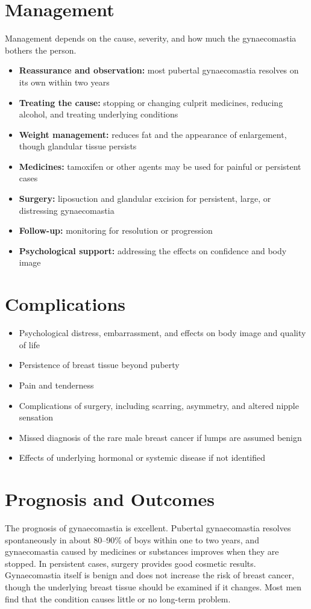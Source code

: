 \section*{Management}
Management depends on the cause, severity, and how much the gynaecomastia bothers the person.

\begin{itemize}
    \item \textbf{Reassurance and observation:} most pubertal gynaecomastia resolves on its own within two years
    \item \textbf{Treating the cause:} stopping or changing culprit medicines, reducing alcohol, and treating underlying conditions
    \item \textbf{Weight management:} reduces fat and the appearance of enlargement, though glandular tissue persists
    \item \textbf{Medicines:} tamoxifen or other agents may be used for painful or persistent cases
    \item \textbf{Surgery:} liposuction and glandular excision for persistent, large, or distressing gynaecomastia
    \item \textbf{Follow-up:} monitoring for resolution or progression
    \item \textbf{Psychological support:} addressing the effects on confidence and body image
\end{itemize}

\section*{Complications}
\begin{itemize}
    \item Psychological distress, embarrassment, and effects on body image and quality of life
    \item Persistence of breast tissue beyond puberty
    \item Pain and tenderness
    \item Complications of surgery, including scarring, asymmetry, and altered nipple sensation
    \item Missed diagnosis of the rare male breast cancer if lumps are assumed benign
    \item Effects of underlying hormonal or systemic disease if not identified
\end{itemize}

\section*{Prognosis and Outcomes}
The prognosis of gynaecomastia is excellent. Pubertal gynaecomastia resolves spontaneously in about 80--90\% of boys within one to two years, and gynaecomastia caused by medicines or substances improves when they are stopped. In persistent cases, surgery provides good cosmetic results. Gynaecomastia itself is benign and does not increase the risk of breast cancer, though the underlying breast tissue should be examined if it changes. Most men find that the condition causes little or no long-term problem.

